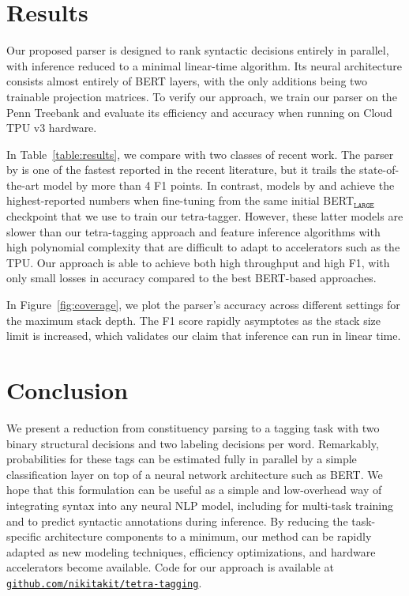 \documentclass[11pt,a4paper]{article}
\begin{document}
\section{Results}

Our proposed parser is designed to rank syntactic decisions entirely in parallel, with inference reduced to a minimal linear-time algorithm. Its neural architecture consists almost entirely of BERT layers, with the only additions being two trainable projection matrices. To verify our approach, we train our parser on the Penn Treebank \citep{marcus-etal-1993-building} and evaluate its efficiency and accuracy when running on Cloud TPU v3 hardware.

In Table~\ref{table:results}, we compare with two classes of recent work. The parser by \citet{vilares-etal-2019-better} is one of the fastest reported in the recent literature, but it trails the state-of-the-art model by more than 4 F1 points. In contrast, models by \citet{zhou-zhao-2019-head} and \citet{kitaev-etal-2019-multilingual} achieve the highest-reported numbers when fine-tuning from the same initial BERT$_\texttt{LARGE}$ checkpoint that we use to train our tetra-tagger. However, these latter models are slower than our tetra-tagging approach and feature inference algorithms with high polynomial complexity that are difficult to adapt to accelerators such as the TPU.
Our approach is able to achieve both high throughput and high F1, with only small losses in accuracy compared to the best BERT-based approaches.

In Figure~\ref{fig:coverage}, we plot the parser's accuracy across different settings for the maximum stack depth. The F1 score rapidly asymptotes as the stack size limit is increased, which validates our claim that inference can run in linear time.

\section{Conclusion}

We present a reduction from constituency parsing to a tagging task with two binary structural decisions and two labeling decisions per word. Remarkably, probabilities for these tags can be estimated fully in parallel by a simple classification layer on top of a neural network architecture such as BERT.
We hope that this formulation can be useful as a simple and low-overhead way of integrating syntax into any neural NLP model, including for multi-task training and to predict syntactic annotations during inference. By reducing the task-specific architecture components to a minimum, our method can be rapidly adapted as new modeling techniques, efficiency optimizations, and hardware accelerators become available. Code for our approach is available at \href{https://github.com/nikitakit/tetra-tagging}{\fontsize{10}{\baselineskip}\selectfont\tt github.com/nikitakit/tetra-tagging}.
\end{document}
